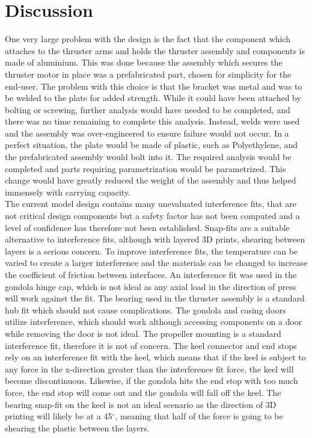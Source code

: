 \documentclass[../main.tex]{subfiles}
\begin{document}
\chapter{Discussion}
One very large problem with the design is the fact that the component which attaches to the thruster arms and holds the thruster assembly and components is made of aluminium. This was done because the assembly which secures the thruster motor in place was a prefabricated part, chosen for simplicity for the end-user. The problem with this choice is that the bracket was metal and was to be welded to the plate for added strength. While it could have been attached by bolting or screwing, further analysis would have needed to be completed, and there was no time remaining to complete this analysis. Instead, welds were used and the assembly was over-engineered to ensure failure would not occur. In a perfect situation, the plate would be made of plastic, such as Polyethylene, and the prefabricated assembly would bolt into it. The required analysis would be completed and parts requiring parametrization would be parametrized. This change would have greatly reduced the weight of the assembly and thus helped immensely with carrying capacity.\\

The current model design contains many unevaluated interference fits, that are not critical design components but a safety factor has not been computed and a level of confidence has therefore not been established. Snap-fits are a suitable alternative to interference fits, although with layered 3D prints, shearing between layers is a serious concern. To improve interference fits, the temperature can be varied to create a larger interference and the materials can be changed to increase the coefficient of friction between interfaces. An interference fit was used in the gondola hinge cap, which is not ideal as any axial load in the direction of press will work against the fit. The bearing used in the thruster assembly is a standard hub fit which should not cause complications. The gondola and casing doors utilize interference, which should work although accessing components on a door while removing the door is not ideal.  The propeller mounting is a standard interference fit, therefore it is not of concern. The keel connector and end stops rely on an interference fit with the keel, which means that if the keel is subject to any force in the x-direction greater than the interference fit force, the keel will become discontinuous. Likewise, if the gondola hits the end stop with too much force, the end stop will come out and the gondola will fall off the keel. The bearing snap-fit on the keel is not an ideal scenario as the direction of 3D printing will likely be at a 45$^{\circ}$, meaning that half of the force is going to be shearing the plastic between the layers.\\
\end{document}
